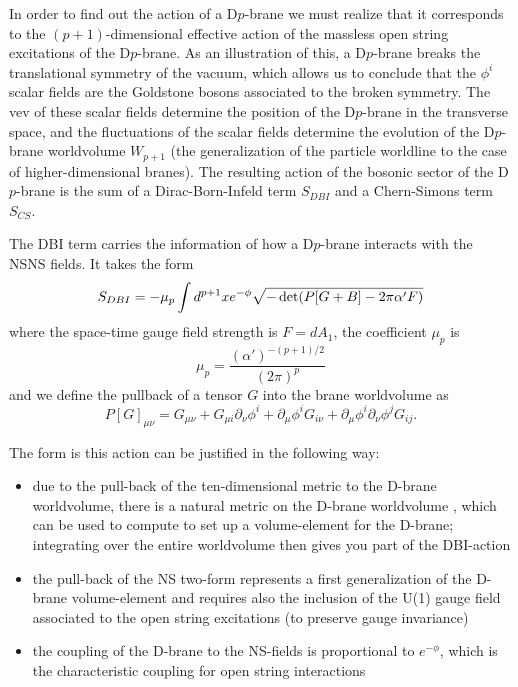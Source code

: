 In order to find out the action of a D$p$-brane we must realize that it corresponds to the
$(p+1)$-dimensional effective action of the massless open string excitations of the D$p$-brane.
As an illustration of this, a D$p$-brane breaks the translational symmetry of the vacuum, which allows
us to conclude that the $\phi^i$ scalar fields are the Goldstone bosons associated to the broken symmetry. 
The vev of these scalar fields determine the position of the D$p$-brane in the transverse space, and the fluctuations of the scalar
fields determine the evolution of the D$p$-brane worldvolume $W_{p+1}$ (the generalization of the particle worldline to the case of higher-dimensional branes). 
The resulting action of the bosonic sector of the D$p$-brane is the sum of a Dirac-Born-Infeld term $S_{DBI}$ and a Chern-Simons term $S_{CS}$.

The DBI term carries the information of how a D$p$-brane interacts with the NSNS fields. 
It takes the form
\begin{equation}
  S_{DBI}= -\mu_p \int d^{p+1} x e^{-\phi} \sqrt{-\det(P\qty[G+B]-2\pi \alpha'F)}
  \label{eq:dirac}
\end{equation}
where the space-time gauge field strength is $F=dA_1$, the coefficient $\mu_p$ is
\begin{equation}
  \mu_p = \frac{(\alpha')^{-(p+1)/2}}{(2\pi)^p}
\end{equation}
and we define the pullback of a tensor $G$ into the brane worldvolume as
\begin{equation}
  P[G]_{\mu\nu}=G_{\mu\nu}+G_{\mu i}\partial_\nu \phi^i + \partial_\mu \phi^iG_{i\nu}+\partial_\mu\phi^i\partial_\nu\phi^j G_{ij}.
\end{equation}

The form  is this action can be justified in the following way:
\begin{itemize}
  \item  due to the pull-back of the ten-dimensional metric to the D-brane worldvolume, there is a natural metric on the D-brane worldvolume , which can be used to compute to set up a volume-element for the D-brane; integrating over the entire worldvolume then gives you part of the DBI-action

 \item the pull-back of the NS two-form represents a first generalization of the D-brane volume-element and requires also the inclusion of the U(1) gauge field associated to the open string excitations (to preserve gauge invariance)

  \item the coupling of the D-brane to the NS-fields is proportional to $e^{-\phi}$, which is the characteristic coupling for open string interactions
\end{itemize}


